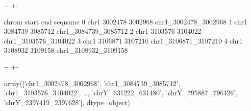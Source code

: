 \documentclass[letterpaper,10pt,english]{sphinxmanual}
\newlength\nbsphinxcodecellspacing
\begin{document}
{

\kern-\sphinxverbatimsmallskipamount\kern-\baselineskip
\kern+\FrameHeightAdjust\kern-\fboxrule
\vspace{\nbsphinxcodecellspacing}

\begin{sphinxVerbatim}[commandchars=\\\{\}]
\llap{\color{nbsphinxout}[4]:\,\hspace{\fboxrule}\hspace{\fboxsep}}  chrom    start      end               seqname
0  chr1  3002478  3002968  chr1\_3002478\_3002968
1  chr1  3084739  3085712  chr1\_3084739\_3085712
2  chr1  3103576  3104022  chr1\_3103576\_3104022
3  chr1  3106871  3107210  chr1\_3106871\_3107210
4  chr1  3108932  3109158  chr1\_3108932\_3109158
\end{sphinxVerbatim}
}

{
\begin{sphinxVerbatim}[commandchars=\\\{\}]
\llap{\color{nbsphinxin}[6]:\,\hspace{\fboxrule}\hspace{\fboxsep}}
  
\end{sphinxVerbatim}
}

{

\kern-\sphinxverbatimsmallskipamount\kern-\baselineskip
\kern+\FrameHeightAdjust\kern-\fboxrule
\vspace{\nbsphinxcodecellspacing}

\begin{sphinxVerbatim}[commandchars=\\\{\}]
\llap{\color{nbsphinxout}[6]:\,\hspace{\fboxrule}\hspace{\fboxsep}}array(['chr1\_3002478\_3002968', 'chr1\_3084739\_3085712',
       'chr1\_3103576\_3104022', {\ldots}, 'chrY\_631222\_631480',
       'chrY\_795887\_796426', 'chrY\_2397419\_2397628'], dtype=object)
\end{sphinxVerbatim}
}
\end{document}

